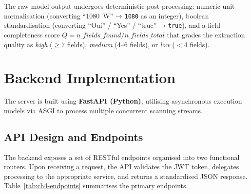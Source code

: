 The raw model output undergoes deterministic post-processing: numeric unit normalisation (converting ``1080~W'' → \texttt{1080} as an integer), boolean standardisation (converting ``Oui'' / ``Yes'' / ``true'' → \texttt{true}), and a field-completeness score $Q = n\_fields\_found / n\_fields\_total$ that grades the extraction quality as \textit{high} ($\geq 7$ fields), \textit{medium} (4–6 fields), or \textit{low} ($<4$ fields).

\section{Backend Implementation}
\label{sec:ch4-backend}

The server is built using \textbf{FastAPI (Python)}, utilising asynchronous execution models via ASGI to process multiple concurrent scanning streams.

\subsection{API Design and Endpoints}

The backend exposes a set of RESTful endpoints organised into two functional routers. Upon receiving a request, the API validates the JWT token, delegates processing to the appropriate service, and returns a standardised JSON response. Table~\ref{tab:ch4-endpoints} summarises the primary endpoints.

